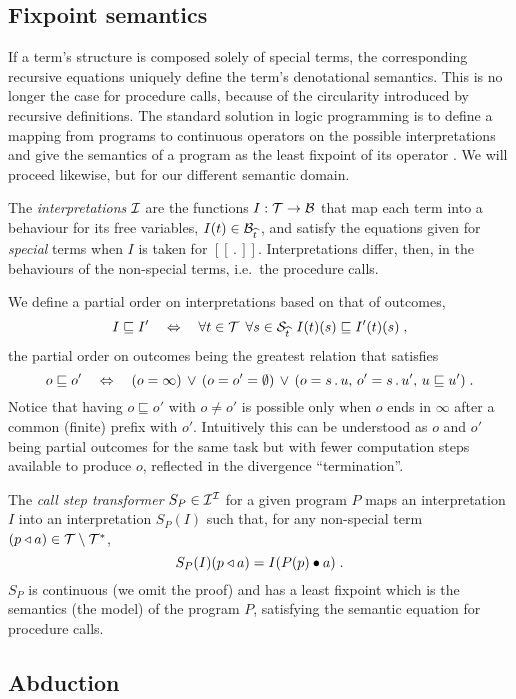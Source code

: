 \documentclass{tlp}
\def\around#1#2{#1#2#1}
\def\imp{\rightarrow}
\def\Bic{\Leftrightarrow}
\def\scor{\around\,\cor}
\def\B{{\cal B}}               \def\C{{\cal C}}               \def\E{{\cal E}}               \def\F{{\cal F}}
\def\I{{\cal I}}               \def\N{{\cal N}}               \def\O{{\cal O}}               \def\R{{\cal R}}
\def\S{{\cal S}}               \def\T{{\cal T}}               \def\V{{\cal V}}               \def\dlt{\triangle}
\def\denotstart{[\![\,}
\def\denotend{\,]\!]}
\def\denot#1{\denotstart#1\denotend}
\def\Stng{\S}
\def\appl#1#2{#1\applsym#2}
\def\fv#1{\widehat{#1}}
\def\ff{\emptyset}
\def\soutsym{{\,.\,}}
\def\sout#1#2{#1\soutsym#2}
\newcommand{\apply}[2]{#1\bullet#2}
\newcommand{\stp}{S_P}
\begin{document}
\subsection{Fixpoint semantics}

If a term's structure is composed solely of special terms, the corresponding
recursive equations uniquely define the term's
denotational semantics. This is no longer the case for procedure calls,
because of the circularity introduced by recursive definitions. The
standard solution in logic programming is to define a mapping from programs to
continuous operators on the possible interpretations and give the semantics
of a program as the least fixpoint of its operator \cite{v-em_ko:76:splpl}. We will
proceed likewise, but for our different semantic domain.

The \emph{interpretations} $\I$ are the functions $I:\T\imp\B$ that map each term
into a behaviour for its free variables, $I(t)\in\B_{\fv t}\,$,
and satisfy the equations given for \emph{special} terms when $I$ is taken
for $\denot .$. Interpretations differ, then, in the behaviours of the
non-special terms, i.e.\ the procedure calls.

We define a partial order on interpretations based on that of
outcomes,$$I\sqsubseteq I'\quad\Bic\quad\forall t\in\T\;\,\forall
s\in\Stng_{\fv{t}}\;\,I(t)(s)\sqsubseteq I'(t)(s)\;,$$
the partial order on outcomes being the greatest relation
that satisfies
$$o\sqsubseteq o'\quad\Bic\quad(o=\infty)\scor(o=o'=\ff)\scor(o=\sout
su,\,o'=\sout s{u'},\,u\sqsubseteq u')\;.$$ 
Notice that having $o\sqsubseteq o'$ with
$o\neq o'$ is possible only when $o$ ends in $\infty$ after a common (finite) prefix with
$o'$. Intuitively this can be understood as $o$ and $o'$ being partial outcomes
for the same task but with fewer computation steps available to produce $o$,
reflected in the divergence ``termination''.

The \emph{call step transformer} $\stp\in\I^\I$ for a given program $P$
maps an interpretation $I$ into an interpretation $\stp(I)$ such that,
for any non-special term $(\appl pa)\in\T\setminus\T^\ast$,
$$\stp(I)(\appl pa)=I(\apply{P(p)}a)\;.$$
$\stp$ is continuous (we omit the proof) and has a least fixpoint which is the
semantics (the model) of the program $P$, satisfying the semantic equation
 for  procedure calls.

\subsection{Abduction}
\end{document}
